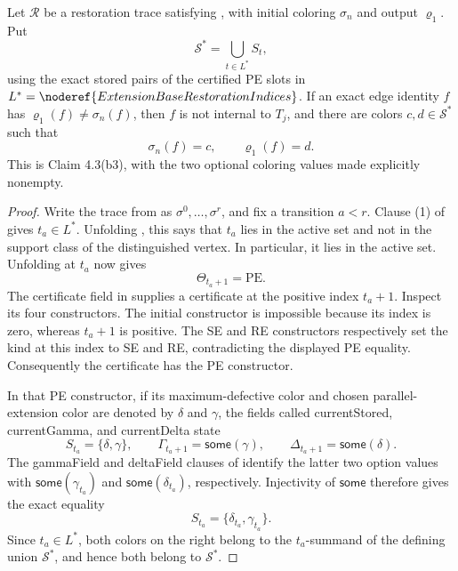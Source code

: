 \begin{lemma}
Let \(\mathcal R\) be a restoration trace satisfying
, with initial coloring
\(\sigma_n\) and output \(\varrho_1\).  Put
\[
                         \mathcal S^*
   =\bigcup_{t\in L^*}S_t,
\]
using the exact stored pairs of the certified PE slots in
\(L^*=\noderef{ExtensionBaseRestorationIndices}\).  If an exact edge
identity \(f\) has
\(\varrho_1(f)\ne\sigma_n(f)\), then \(f\) is not internal to \(T_j\),
and there are colors \(c,d\in\mathcal S^*\) such that
\[
                     \sigma_n(f)=c,\qquad \varrho_1(f)=d.
\]
This is Claim 4.3(b3), with the two optional coloring values made
explicitly nonempty.
\end{lemma}
\begin{proof}
Write the trace from  as
\(\sigma^0,\ldots,\sigma^r\), and fix a transition \(a<r\).  Clause (1)
of  gives
\(t_a\in L^*\).  Unfolding
, this says that \(t_a\) lies
in the active set and not in the support class of the distinguished
vertex.  In particular, it lies in the active set.  Unfolding
 at \(t_a\) now gives
\[
       \Theta_{t_a+1}=\mathrm{PE}.
\]
The certificate field in  supplies a
 certificate at the positive index
\(t_a+1\).  Inspect its four constructors.  The initial constructor is
impossible because its index is zero, whereas \(t_a+1\) is positive.
The SE and RE constructors respectively set the kind at this index to
SE and RE, contradicting the displayed PE equality.  Consequently the
certificate has the PE constructor.

In that PE constructor, if its maximum-defective color and chosen
parallel-extension color are denoted by \(\delta\) and \(\gamma\), the
fields called currentStored, currentGamma, and currentDelta state
\[
 S_{t_a}=\{\delta,\gamma\},\qquad
 \Gamma_{t_a+1}=\mathsf{some}(\gamma),\qquad
 \Delta_{t_a+1}=\mathsf{some}(\delta).
\]
The gammaField and deltaField clauses of
 identify the latter two option
values with
\(\mathsf{some}(\gamma_{t_a})\) and
\(\mathsf{some}(\delta_{t_a})\), respectively.  Injectivity of
\(\mathsf{some}\) therefore gives the exact equality
\[
          S_{t_a}=\{\delta_{t_a},\gamma_{t_a}\}.
\]
Since \(t_a\in L^*\), both colors on the right belong to the
\(t_a\)-summand of the defining union \(\mathcal S^*\), and hence both
belong to \(\mathcal S^*\).


\end{proof}
